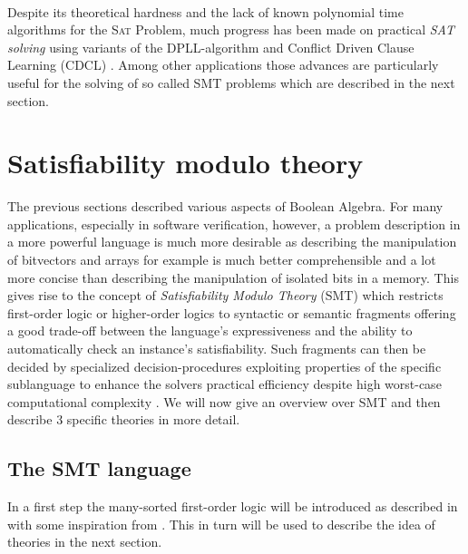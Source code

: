 \paragraph{}
Despite its theoretical hardness and the lack of known polynomial time algorithms for the \textsc{Sat} Problem, much progress has been made on practical \textit{SAT solving} using variants of the DPLL-algorithm and Conflict Driven Clause Learning (CDCL) \cite{Marques-Silva-PropositionalSATSolving}.
Among other applications those advances are particularly useful for the solving of so called SMT problems which are described in the next section.


\section{Satisfiability modulo theory}
The previous sections described various aspects of Boolean Algebra.
For many applications, especially in software verification, however, a problem description in a more powerful language is much more desirable as describing the manipulation of bitvectors and arrays for example is much better comprehensible and a lot more concise than describing the manipulation of isolated bits in a memory.
This gives rise to the concept of \textit{Satisfiability Modulo Theory} (SMT) which restricts first-order logic or higher-order logics to syntactic or semantic fragments offering a good trade-off between the language's expressiveness and the ability to automatically check an instance's satisfiability.
Such fragments can then be decided by specialized decision-procedures exploiting properties of the specific sublanguage to enhance the solvers practical efficiency despite high worst-case computational complexity \cite{Barrett-Tinelli-SMT}. We will now give an overview over SMT and then describe 3 specific theories in more detail.

\subsection{The SMT language}
In a first step the many-sorted first-order logic will be introduced as described in \cite{Barrett-Tinelli-SMT} with some inspiration from \cite{fondements-logique}. This in turn will be used to describe the idea of theories in the next section.

